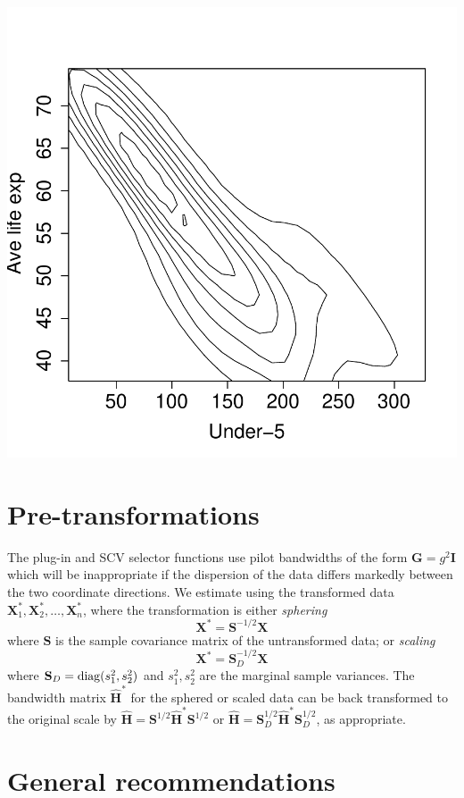 \documentclass[a4paper,11pt]{article}
\renewcommand{\vec}[1]{\boldsymbol{#1}}
\newcommand{\mat}[1]{\mathbf{#1}}
\def\HH{\mat{H}}
\begin{document}
\begin{center}
\includegraphics{kde-020}
\end{center}

\section{Pre-transformations}
\label{sec:pre}
The plug-in and SCV selector functions use pilot bandwidths of the 
form $\mat{G} = g^2 \mat{I}$ which will be 
inappropriate if the dispersion of the data differs 
markedly between the two coordinate 
directions. We estimate using the transformed data 
$\vec{X}_1^*, \vec{X}_2^*, 
\dots, \vec{X}_n^*$, where the transformation is either {\em sphering} 
$$\vec{X}^*= \mat{S}^{-1/2} \vec{X}$$
where $\mat{S}$ is the sample covariance matrix of the untransformed data; 
or {\em scaling}
$$\vec{X}^*= \mat{S}_D^{-1/2} \vec{X}$$
where $\mat{S}_D = {\rm diag}(s_{1}^2, s_{2}^2)$ and $s_1^2, s_2^2$ are 
the marginal sample variances. The  
bandwidth matrix $\hat{\HH}^*$
for the sphered or scaled data can be back transformed to the original scale by 
$\hat{\HH} = \mat{S}^{1/2} \hat{\HH}^* \mat{S}^{1/2}$ or 
$\hat{\HH} = 
\mat{S}_D^{1/2} \hat{\HH}^* \mat{S}_D^{1/2}$, as appropriate.


\section{General recommendations}
\end{document}
